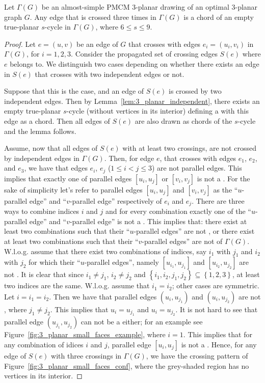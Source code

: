 \begin{lemma}\label{lem:3_planar_small_faces}
Let $\Gamma(G)$ be an almost-simple PMCM $3$-planar drawing of an optimal $3$-planar graph $G$. Any edge that is crossed three times in  $\Gamma(G)$ is a chord of an empty true-planar $s$-cycle in $\Gamma(G)$, where $6\leq s\leq 9$. 
\end{lemma}
\begin{proof}

Let $e=(u,v)$ be an edge of $G$ that crosses with edges $e_i=(u_i,v_i)$ in $\Gamma(G)$, for $i=1,2,3$. Consider the propagated set of crossing edges $S(e)$ where $e$ belongs to. We distinguish two cases depending on whether there exists an edge in $S(e)$ that crosses with two independent edges or not.

Suppose that this is the case, and an edge of $S(e)$ is crossed by two independent edges. Then by Lemma~\ref{lem:3_planar_independent}, there exists an empty true-planar $s$-cycle (without vertices in its interior) defining a \pp with this edge as a chord. Then all edges of $S(e)$ are also drawn as chords of the $s$-cycle and the lemma follows.

Assume, now that all edges of $S(e)$ with at least two crossings, are not crossed by independent edges in $\Gamma(G)$. Then, for edge $e$, that crosses with edges $e_1$, $e_2$, and $e_3$, we have that edges $e_i$, $e_j$ ($1\leq i<j\leq 3$) are not parallel edges. This implies that exactly one of parallel edges $[u_i,u_j]$ or $[v_i,v_j]$ is not a \pe. For the sake of simplicity let's refer to parallel edges $[u_i,u_j]$ and $[v_i,v_j]$ as the ``$u$-parallel edge'' and ``$v$-parallel edge'' respectively of $e_i$ and $e_j$. 
There are three ways to combine indices $i$ and $j$ and for every combination exactly one of the ``$u$-parallel edge'' and ``$v$-parallel edge'' is not a \pe. This implies that: there exist at least two combinations such that their ``$u$-parallel edges'' are not \pes, or there exist at least two combinations such that their ``$v$-parallel edges'' are not \pes of $\Gamma(G)$. W.l.o.g. assume that there exist two combinations of indices, say $i_1$ with $j_1$ and $i_2$ with $j_2$ for which their ``$u$-parallel edges'', namely $[u_{i_1},u_{j_1}]$ and $[u_{i_2},u_{j_2}]$  are not \pes. It is clear that since $i_1\neq j_1$, $i_2\neq j_2$ and $\left\{i_1,i_2,j_1,j_2\right\}\subseteq\left\{1,2,3\right\}$, at least two indices are the same. W.l.o.g. assume that $i_1=i_2$; other cases are symmetric. Let $i=i_1=i_2$. Then we have that parallel edges  $(u_i,u_{j_1})$ and $(u_i,u_{j_2})$ are not \pes, where $j_1\neq j_2$. This implies that $u_i=u_{j_1}$ and $u_i=u_{j_2}$. It is not hard to see that parallel edge $(u_{j_1},u_{j_2})$ can not be a \pe either; for an example see Figure~\ref{fig:3_planar_small_faces_example}, where $i=1$. This implies that for any combination of idices $i$ and $j$, parallel edge $[u_i,u_j]$ is not a \pe. Hence, for any edge of $S(e)$ with three crossings in $\Gamma(G)$, we have the crossing pattern of Figure~\ref{fig:3_planar_small_faces_conf}, where the grey-shaded region has no vertices in its interior.


\end{proof}
